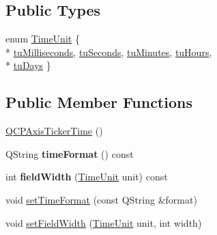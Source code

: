 \subsection*{Public Types}
\begin{DoxyCompactItemize}
\item 
enum \hyperlink{classQCPAxisTickerTime_a5c48ded8c6d3a1aca9b68219469fea3e}{Time\+Unit} \{ \\*
\hyperlink{classQCPAxisTickerTime_a5c48ded8c6d3a1aca9b68219469fea3ea809db637d2a7f601287c8790facc25cf}{tu\+Milliseconds}, 
\hyperlink{classQCPAxisTickerTime_a5c48ded8c6d3a1aca9b68219469fea3ea22b2c1842215272ae827eea2d1cc037d}{tu\+Seconds}, 
\hyperlink{classQCPAxisTickerTime_a5c48ded8c6d3a1aca9b68219469fea3ea682de6640daef46cffd8a080348d7d00}{tu\+Minutes}, 
\hyperlink{classQCPAxisTickerTime_a5c48ded8c6d3a1aca9b68219469fea3ea83a5713594424ba17f1f62f18f0e5935}{tu\+Hours}, 
\\*
\hyperlink{classQCPAxisTickerTime_a5c48ded8c6d3a1aca9b68219469fea3eaf9729e64545307a80a0e3527d6da6556}{tu\+Days}
 \}
\end{DoxyCompactItemize}
\subsection*{Public Member Functions}
\begin{DoxyCompactItemize}
\item 
\hyperlink{classQCPAxisTickerTime_a5145aac1d2117fdac411d9e8552cc41b}{Q\+C\+P\+Axis\+Ticker\+Time} ()
\item 
Q\+String {\bfseries time\+Format} () const \hypertarget{classQCPAxisTickerTime_a7131ca197593d941adaea6faa75249d0}{}\label{classQCPAxisTickerTime_a7131ca197593d941adaea6faa75249d0}

\item 
int {\bfseries field\+Width} (\hyperlink{classQCPAxisTickerTime_a5c48ded8c6d3a1aca9b68219469fea3e}{Time\+Unit} unit) const \hypertarget{classQCPAxisTickerTime_a13f16bf1335ab365a841496c27a6b71c}{}\label{classQCPAxisTickerTime_a13f16bf1335ab365a841496c27a6b71c}

\item 
void \hyperlink{classQCPAxisTickerTime_a2f30b6e5125bce4256be9ce3177088ea}{set\+Time\+Format} (const Q\+String \&format)
\item 
void \hyperlink{classQCPAxisTickerTime_adc13e54fc969be98a5c0e3fa0dbaa293}{set\+Field\+Width} (\hyperlink{classQCPAxisTickerTime_a5c48ded8c6d3a1aca9b68219469fea3e}{Time\+Unit} unit, int width)
\end{DoxyCompactItemize}
